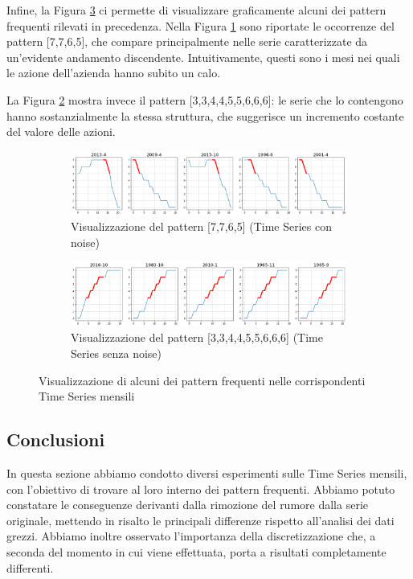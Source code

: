 \documentclass[a4paper]{article}
\begin{document}
Infine, la Figura \ref{fig:patterns} ci permette di visualizzare graficamente alcuni dei pattern frequenti rilevati in precedenza. Nella Figura \ref{subfig:pat_noise} sono riportate le occorrenze del pattern [7,7,6,5], che compare principalmente nelle serie caratterizzate da un'evidente andamento discendente. Intuitivamente, questi sono i mesi nei quali le azione dell'azienda hanno subito un calo.

La Figura \ref{subfig:pat_no_noise} mostra invece il pattern [3,3,4,4,5,5,6,6,6]: le serie che lo contengono hanno sostanzialmente la stessa struttura, che suggerisce un incremento costante del valore delle azioni.

\begin{figure}[h]
\centering
\begin{subfigure}[b]{\linewidth}
\includegraphics[width=\linewidth]{images/discr_poi_noise.png}
\caption{Visualizzazione del pattern [7,7,6,5] (Time Series con noise)}
\label{subfig:pat_noise}
\end{subfigure}
\begin{subfigure}[b]{\linewidth}
\includegraphics[width=\linewidth]{images/discr_poi_no_noise.png}
\caption{Visualizzazione del pattern [3,3,4,4,5,5,6,6,6] (Time Series senza noise)}
\label{subfig:pat_no_noise}
\end{subfigure}
\caption{Visualizzazione di alcuni dei pattern frequenti nelle corrispondenti Time Series mensili}
\label{fig:patterns}
\end{figure}

\subsection{Conclusioni}
In questa sezione abbiamo condotto diversi esperimenti sulle Time Series mensili, con l'obiettivo di trovare al loro interno dei pattern frequenti. Abbiamo potuto constatare le conseguenze derivanti dalla rimozione del rumore dalla serie originale, mettendo in risalto le principali differenze rispetto all'analisi dei dati grezzi. Abbiamo inoltre osservato l'importanza della discretizzazione che, a seconda del momento in cui viene effettuata, porta a risultati completamente differenti.
\end{document}
